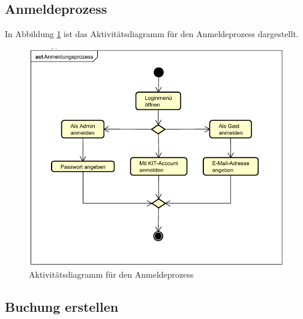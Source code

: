 \subsection{Anmeldeprozess}

In Abbildung \ref{fig:activity_diagram_login} ist das Aktivitätsdiagramm für den Anmeldeprozess dargestellt.
\begin{figure}[ht]
    \centering
    \includegraphics[scale=0.15]{figures/activitydiagrams/anmeldeprozess}
    \caption{Aktivitätsdiagramm für den Anmeldeprozess}
    \label{fig:activity_diagram_login}
\end{figure}
\clearpage
\subsection{Buchung erstellen}

